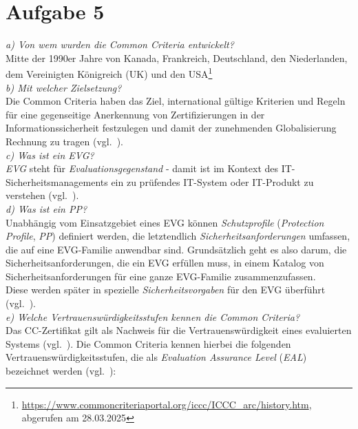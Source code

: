 \chapter{Aufgabe 5}

\textit{a) Von wem wurden die Common Criteria entwickelt?}\\

Mitte der 1990er Jahre von Kanada, Frankreich, Deutschland, den Niederlanden, dem Vereinigten Königreich (UK) und den USA\footnote{
    \url{https://www.commoncriteriaportal.org/iccc/ICCC_arc/history.htm}, abgerufen am 28.03.2025
}\\

\noindent
\textit{b) Mit welcher Zielsetzung?}\\

Die Common Criteria haben das Ziel, international gültige Kriterien und Regeln für eine gegenseitige Anerkennung von Zertifizierungen in der Informationssicherheit festzulegen und damit der zunehmenden Globalisierung Rechnung zu tragen (vgl.~\cite[85]{ITS2}).\\

\noindent
\textit{c) Was ist ein EVG?}\\

\textit{EVG} steht für \textit{Evaluationsgegenstand} - damit ist im Kontext des IT-Sicherheitsmanagements ein zu prüfendes IT-System oder IT-Produkt zu verstehen (vgl.~\cite[86]{ITS2}).\\

\noindent
\textit{d) Was ist ein PP?}\\

Unabhängig vom Einsatzgebiet eines EVG können \textit{Schutzprofile} (\textit{Protection Profile}, \textit{PP}) definiert werden, die letztendlich \textit{Sicherheitsanforderungen} umfassen, die auf eine EVG-Familie anwendbar sind.
Grundsätzlich geht es also darum, die Sicherheitsanforderungen, die ein EVG erfüllen muss, in einem Katalog von Sicherheitsanforderungen für eine ganze EVG-Familie zusammenzufassen.\\
Diese werden später in spezielle \textit{Sicherheitsvorgaben} für den EVG überführt (vgl.~\cite[219f.]{Eck18}).\\

\noindent
\textit{e) Welche Vertrauenswürdigkeitsstufen kennen die Common Criteria?}\\

Das CC-Zertifikat gilt als Nachweis für die Vertrauenswürdigkeit eines evaluierten Systems (vgl.~\cite[219]{Eck18}).
Die Common Criteria kennen hierbei die folgenden Vertrauenswürdigkeitsstufen, die als \textit{Evaluation Assurance Level} (\textit{EAL}) bezeichnet werden (vgl.~\cite[94f.]{ITS2}):

